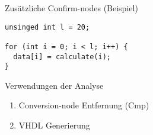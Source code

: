 \begin{frame}[fragile]{Zusätzliche Confirm-nodes (Beispiel)}
\begin{lstlisting}
unsinged int l = 20;

for (int i = 0; i < l; i++) {
  data[i] = calculate(i);
}
\end{lstlisting}
\end{frame}


\begin{frame}{Verwendungen der Analyse}
\begin{enumerate}
	\item Conversion-node Entfernung (Cmp)
	\item VHDL Generierung
\end{enumerate}
\end{frame}

